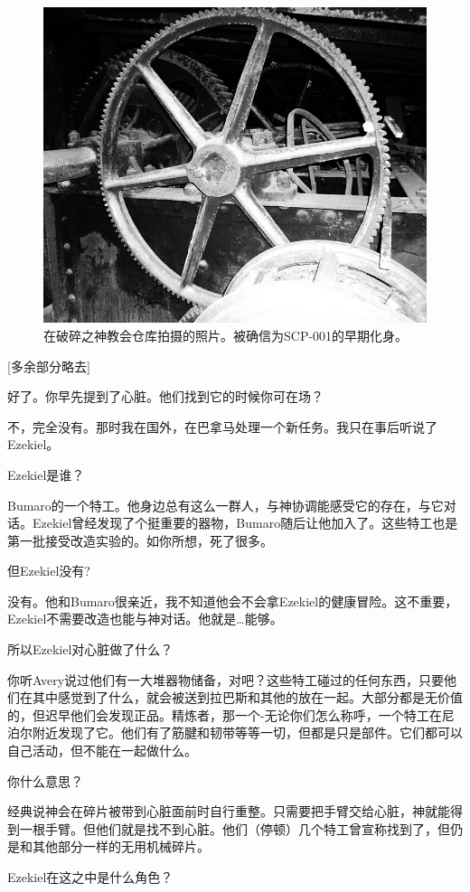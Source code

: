 \begin{figure}[H]
	\centering
	\includegraphics[width=0.5\linewidth]{images/SCP.001.the.broken.god.4.jpg}
	\caption*{在破碎之神教会仓库拍摄的照片。被确信为SCP-001的早期化身。}
\end{figure}


\begin{scpbox}

[多余部分略去]

好了。你早先提到了心脏。他们找到它的时候你可在场？

不，完全没有。那时我在国外，在巴拿马处理一个新任务。我只在事后听说了Ezekiel。

Ezekiel是谁？

Bumaro的一个特工。他身边总有这么一群人，与神协调能感受它的存在，与它对话。Ezekiel曾经发现了个挺重要的器物，Bumaro随后让他加入了。这些特工也是第一批接受改造实验的。如你所想，死了很多。

但Ezekiel没有?

没有。他和Bumaro很亲近，我不知道他会不会拿Ezekiel的健康冒险。这不重要，Ezekiel不需要改造也能与神对话。他就是…能够。

所以Ezekiel对心脏做了什么？

你听Avery说过他们有一大堆器物储备，对吧？这些特工碰过的任何东西，只要他们在其中感觉到了什么，就会被送到拉巴斯和其他的放在一起。大部分都是无价值的，但迟早他们会发现正品。精炼者，那一个-无论你们怎么称呼，一个特工在尼泊尔附近发现了它。他们有了筋腱和韧带等等一切，但都是只是部件。它们都可以自己活动，但不能在一起做什么。

你什么意思？

经典说神会在碎片被带到心脏面前时自行重整。只需要把手臂交给心脏，神就能得到一根手臂。但他们就是找不到心脏。他们（停顿）几个特工曾宣称找到了，但仍是和其他部分一样的无用机械碎片。

Ezekiel在这之中是什么角色？


\end{scpbox}
